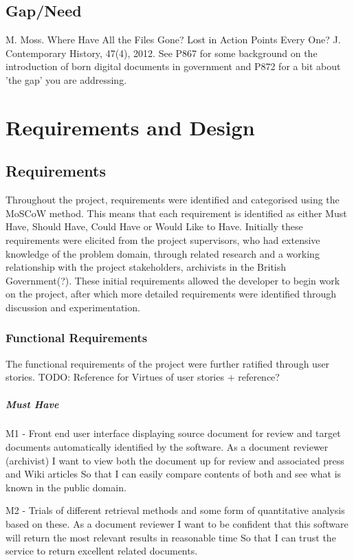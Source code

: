 \documentclass{l4proj}
\begin{document}
\section{Gap/Need}
M. Moss. Where Have All the Files Gone? Lost in Action Points Every One? J. Contemporary History, 47(4), 2012.
See P867 for some background on the introduction of born digital documents in government and P872 for a bit about 'the gap’ you are addressing.

\chapter{Requirements and Design}
\section{Requirements}
Throughout the project, requirements were identified and categorised using the MoSCoW method. This means that each requirement is identified as either Must Have, Should Have, Could Have or Would Like to Have.
Initially these requirements were elicited from the project supervisors, who had extensive knowledge of the problem domain, through related research and a working relationship with the project stakeholders, archivists in the British Government(?).
These initial requirements allowed the developer to begin work on the project, after which more detailed requirements were identified through discussion and experimentation.

\subsection{Functional Requirements}
The functional requirements of the project were further ratified through user stories. 
TODO: Reference for Virtues of user stories + reference?
\paragraph{Must Have\\}
M1 - Front end user interface displaying source document for review and target documents automatically identified by the software.
      As a document reviewer (archivist)
      I want to view both the document up for review and associated press and Wiki articles
      So that I can easily compare contents of both and see what is known in the public domain.

M2 - Trials of different retrieval methods and some form of quantitative analysis based on these.
      As a document reviewer
      I want to be confident that this software will return the most relevant results in reasonable time
      So that I can trust the service to return excellent related documents.
\end{document}
